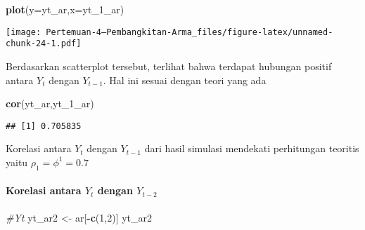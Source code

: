 \documentclass[
]{article}
\newenvironment{Shaded}{\begin{snugshade}}{\end{snugshade}}
\newcommand{\AttributeTok}[1]{\textcolor[rgb]{0.13,0.29,0.53}{#1}}
\newcommand{\CommentTok}[1]{\textcolor[rgb]{0.56,0.35,0.01}{\textit{#1}}}
\newcommand{\DecValTok}[1]{\textcolor[rgb]{0.00,0.00,0.81}{#1}}
\newcommand{\FunctionTok}[1]{\textcolor[rgb]{0.13,0.29,0.53}{\textbf{#1}}}
\newcommand{\NormalTok}[1]{#1}
\newcommand{\OtherTok}[1]{\textcolor[rgb]{0.56,0.35,0.01}{#1}}
\newcommand{\SpecialCharTok}[1]{\textcolor[rgb]{0.81,0.36,0.00}{\textbf{#1}}}
\begin{document}
\begin{Shaded}
\begin{Highlighting}[]
\FunctionTok{plot}\NormalTok{(}\AttributeTok{y=}\NormalTok{yt\_ar,}\AttributeTok{x=}\NormalTok{yt\_1\_ar)}
\end{Highlighting}
\end{Shaded}

\texttt{[image: Pertemuan-4---Pembangkitan-Arma\_files/figure-latex/unnamed-chunk-24-1.pdf]}

Berdasarkan scatterplot tersebut, terlihat bahwa terdapat hubungan
positif antara \(Y_t\) dengan \(Y_{t-1}\). Hal ini sesuai dengan teori
yang ada

\begin{Shaded}
\begin{Highlighting}[]
\FunctionTok{cor}\NormalTok{(yt\_ar,yt\_1\_ar)}
\end{Highlighting}
\end{Shaded}

\begin{verbatim}
## [1] 0.705835
\end{verbatim}

Korelasi antara \(Y_t\) dengan \(Y_{t-1}\) dari hasil simulasi mendekati
perhitungan teoritis yaitu \(\rho_1=\phi^1=0.7\)

\paragraph{\texorpdfstring{Korelasi antara \(Y_t\) dengan
\(Y_{t-2}\)}{Korelasi antara Y\_t dengan Y\_\{t-2\}}}\label{korelasi-antara-y_t-dengan-y_t-2-1}

\begin{Shaded}
\begin{Highlighting}[]
\CommentTok{\#Yt}
\NormalTok{yt\_ar2 }\OtherTok{\textless{}{-}}\NormalTok{ ar[}\SpecialCharTok{{-}}\FunctionTok{c}\NormalTok{(}\DecValTok{1}\NormalTok{,}\DecValTok{2}\NormalTok{)]}
\NormalTok{yt\_ar2}
\end{Highlighting}
\end{Shaded}
\end{document}
